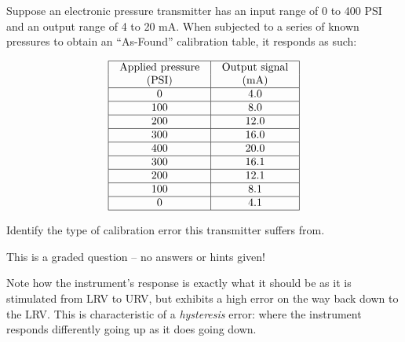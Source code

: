 

Suppose an electronic pressure transmitter has an input range of 0 to 400 PSI and an output range of 4 to 20 mA.  When subjected to a series of known pressures to obtain an ``As-Found'' calibration table, it responds as such:


$$\vbox{\offinterlineskip
\halign{\strut
\vrule \quad\hfil # \ \hfil & 
\vrule \quad\hfil # \ \hfil \vrule \cr
\noalign{\hrule}
%
Applied pressure & Output signal \cr
%
(PSI) & (mA) \cr
%
\noalign{\hrule}
%
0 & 4.0 \cr
%
\noalign{\hrule}
%
100 & 8.0 \cr
%
\noalign{\hrule}
%
200 & 12.0 \cr
%
\noalign{\hrule}
%
300 & 16.0 \cr
%
\noalign{\hrule}
%
400 & 20.0 \cr
%
\noalign{\hrule}
%
300 & 16.1 \cr
%
\noalign{\hrule}
%
200 & 12.1 \cr
%
\noalign{\hrule}
%
100 & 8.1 \cr
%
\noalign{\hrule}
%
0 & 4.1 \cr
%
\noalign{\hrule}
} %
}$$ %

\vskip 10pt

Identify the type of calibration error this transmitter suffers from.

\vfil 

\eject






This is a graded question -- no answers or hints given!







Note how the instrument's response is exactly what it should be as it is stimulated from LRV to URV, but exhibits a high error on the way back down to the LRV.  This is characteristic of a {\it hysteresis} error: where the instrument responds differently going up as it does going down.




